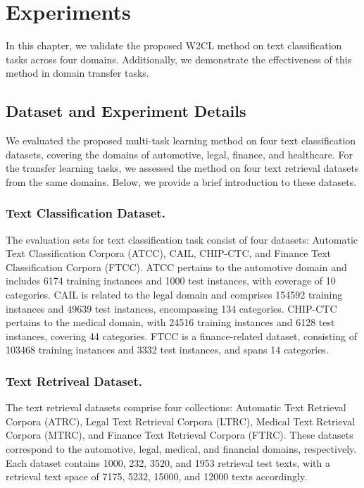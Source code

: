 \section{Experiments}
\label{sec:exp}
In this chapter, we validate the proposed W2CL method on text classification tasks across four domains. Additionally, we demonstrate the effectiveness of this method in domain transfer tasks.
\subsection{Dataset and Experiment Details}
We evaluated the proposed multi-task learning method on four text classification datasets, covering the domains of automotive, legal, finance, and healthcare. For the transfer learning tasks, we assessed the method on four text retrieval datasets from the same domains. Below, we provide a brief introduction to these datasets.

\subsubsection{Text Classification Dataset.} The evaluation sets for text classification task consist of four datasets: Automatic Text Classification Corpora (ATCC), CAIL, CHIP-CTC, and Finance Text Classification Corpora (FTCC). ATCC pertains to the automotive domain and includes 6174 training instances and 1000 test instances, with coverage of 10 categories. CAIL is related to the legal domain and comprises 154592 training instances and 49639 test instances, encompassing 134 categories. CHIP-CTC pertains to the medical domain, with 24516 training instances and 6128 test instances, covering 44 categories. FTCC is a finance-related dataset, consisting of 103468 training instances and 3332 test instances, and spans 14 categories.

\subsubsection{Text Retriveal Dataset.} The text retrieval datasets comprise four collections: Automatic Text Retrieval Corpora (ATRC), Legal Text Retrieval Corpora (LTRC), Medical Text Retrieval Corpora (MTRC), and Finance Text Retrieval Corpora (FTRC). These datasets correspond to the automotive, legal, medical, and financial domains, respectively. Each dataset contains 1000, 232, 3520, and 1953 retrieval test texts, with a retrieval text space of 7175, 5232, 15000, and 12000 texts accordingly.

